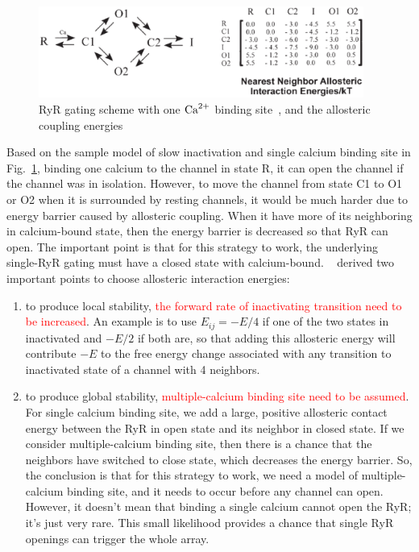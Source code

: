 \begin{figure}[hbt]
  \centerline{\includegraphics[height=3cm,
    angle=0]{./images/RyR_Zahradnikova1996_Stern1999.eps}}%
\caption{RyR gating scheme with one ${\text{Ca}^{2+}}$ binding
site~\citep{zahradnikova1996}, and the allosteric coupling
energies\citep{stern1999lcm}}
\label{fig:RyR_Zharadnikova1996}
\end{figure}

Based on the sample model of slow inactivation and single calcium
binding site in Fig.~\ref{fig:RyR_Zharadnikova1996}, binding one calcium to the
channel in state R, it can open the channel if the channel was in isolation.
However, to move the channel from state C1 to O1 or O2 when it is surrounded by
resting channels, it would be much harder due to energy barrier caused by
allosteric coupling. When it have more of its neighboring in calcium-bound
state, then the energy barrier is decreased so that RyR can open. The important
point is that for this strategy to work, the underlying single-RyR gating must
have a closed state with calcium-bound. ~\citep{stern1999lcm}
derived two important points to choose allosteric interaction
energies:
\begin{enumerate}
\item to produce local stability,
  \textcolor{red}{the forward rate of inactivating transition need to
    be increased}. An example is to use $E_{ij}=-E/4$ if one of the two
    states in inactivated and $-E/2$ if both are, so that adding this
    allosteric energy will contribute $-E$ to the free energy change
    associated with any transition to inactivated state of a channel
    with 4 neighbors.

  \item to produce global stability,
    \textcolor{red}{multiple-calcium binding site need to be assumed}.
    For single calcium binding site, we add a large, positive
    allosteric contact energy between the RyR in open state and its
    neighbor in closed state. If we
    consider multiple-calcium binding site, then there is a chance
    that the neighbors have switched to close state, which decreases
    the energy barrier. So, the conclusion is that for this strategy
    to work, we need a model of multiple-calcium binding site, and it
    needs to occur before any channel can open. However, it doesn't
    mean that binding a single calcium cannot open the RyR; it's just
    very rare. This small likelihood provides a chance that single RyR
    openings can trigger the whole array.
\end{enumerate}

